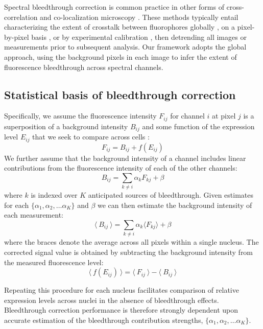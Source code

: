 Spectral bleedthrough correction is common practice in other forms of cross-correlation and co-localization microscopy \cite{Bacia2012,Zinchuk2007}. These methods typically entail characterizing the extent of crosstalk between fluorophores globally \cite{Arsenovic2017,Kim2013}, on a pixel-by-pixel basis \cite{Elangovan2003}, or by experimental calibration \cite{Bacia2012}, then detrending all images or measurements prior to subsequent analysis. Our framework adopts the global approach, using the background pixels in each image to infer the extent of fluorescence bleedthrough across spectral channels.

\subsection{Statistical basis of bleedthrough correction}

Specifically, we assume the fluorescence intensity $F_{ij}$ for channel $i$ at pixel $j$ is a superposition of a background intensity $B_{ij}$ and some function of the expression level $E_{ij}$ that we seek to compare across cells \cite{McMullen2010}:
\begin{equation}
F_{ij} = B_{ij} + f(E_{ij})
\end{equation}
We further assume that the background intensity of a channel includes linear contributions from the fluorescence intensity of each of the other channels:
\begin{equation}
B_{ij} = \sum_{k \neq i}{\alpha_k F_{kj}} + \beta
\end{equation}
where $k$ is indexed over $K$ anticipated sources of bleedthrough. Given estimates for each $\{\alpha_1, \alpha_2, \ldots \alpha_K\}$ and $\beta$ we can then estimate the background intensity of each measurement:
\begin{equation} \label{eq:clones:bg_model}
\langle\ B_{ij}\ \rangle = \sum_{k \neq i}{\alpha_k \langle F_{kj} \rangle} + \beta
\end{equation}
where the braces denote the average across all pixels within a single nucleus. The corrected signal value is obtained by subtracting the background intensity from the measured fluorescence level:
\begin{equation} \label{eq:clones:correction}
\langle\ f(E_{ij}) \ \rangle = \langle\ F_{ij}\ \rangle - \langle\ B_{ij}\ \rangle
\end{equation}

Repeating this procedure for each nucleus facilitates comparison of relative expression levels across nuclei in the absence of bleedthrough effects. Bleedthrough correction performance is therefore strongly dependent upon accurate estimation of the bleedthrough contribution strengths, $\{\alpha_1, \alpha_2, \ldots \alpha_K\}$. 

